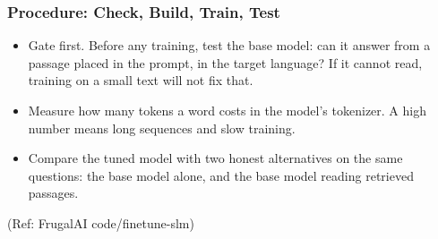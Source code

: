 \begin{frame}[fragile]\frametitle{Procedure: Check, Build, Train, Test}
\begin{center}
\end{center}
\begin{itemize}
\item Gate first. Before any training, test the base model: can it answer from a passage placed in the prompt, in the target language? If it cannot read, training on a small text will not fix that.
\item Measure how many tokens a word costs in the model's tokenizer. A high number means long sequences and slow training.
\item Compare the tuned model with two honest alternatives on the same questions: the base model alone, and the base model reading retrieved passages.
\end{itemize}
{\tiny (Ref: FrugalAI code/finetune-slm)}
\end{frame}

